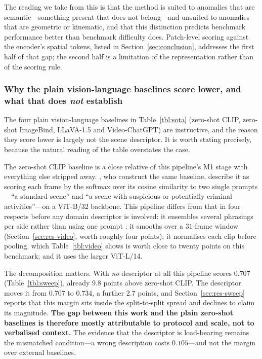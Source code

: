 \documentclass[a4paper,fleqn]{cas-sc}
\begin{document}
The reading we take from this is that the method is suited to anomalies that are
semantic---something present that does not belong---and unsuited to anomalies
that are geometric or kinematic, and that this distinction predicts benchmark
performance better than benchmark difficulty does. Patch-level scoring against
the encoder's spatial tokens, listed in Section~\ref{sec:conclusion}, addresses
the first half of that gap; the second half is a limitation of the
representation rather than of the scoring rule.

\subsubsection{Why the plain vision-language baselines score lower, and what
that does \emph{not} establish}
The four plain vision-language baselines in Table~\ref{tbl:sota} (zero-shot CLIP, zero-shot ImageBind, LLaVA-1.5 and Video-ChatGPT) are instructive, and the reason they score lower is largely not the scene
descriptor. It is worth stating precisely, because the natural reading of the
table overstates the case.

The zero-shot CLIP baseline is a close relative of this pipeline's M1 stage with
everything else stripped away. \citet{zanella2024lavad}, who construct the same
baseline, describe it as scoring each frame by the softmax over its cosine
similarity to two single prompts---``a standard scene'' and ``a scene with
suspicious or potentially criminal activities''---on a ViT-B/32 backbone. This
pipeline differs from that in four respects before any domain descriptor is
involved: it ensembles several phrasings per side rather than using one prompt
\citep{jeong2023winclip}; it smooths over a $31$-frame window
(Section~\ref{sec:res-video}, worth roughly four points); it normalises each clip
before pooling, which Table~\ref{tbl:video} shows is worth close to twenty
points on this benchmark; and it uses the larger ViT-L/14.

The decomposition matters. With \emph{no} descriptor at all this pipeline scores
$0.707$ (Table~\ref{tbl:sweep}), already $9.8$ points above zero-shot CLIP. The
descriptor moves it from $0.707$ to $0.734$, a further $2.7$ points, and
Section~\ref{sec:res-sweep} reports that this margin sits inside the
split-to-split spread and declines to claim its magnitude. \textbf{The gap
between this work and the plain zero-shot baselines is therefore mostly
attributable to protocol and scale, not to verbalised context.} The evidence
that the descriptor is load-bearing remains the mismatched condition---a wrong
description costs $0.105$---and not the margin over external baselines.
\end{document}
